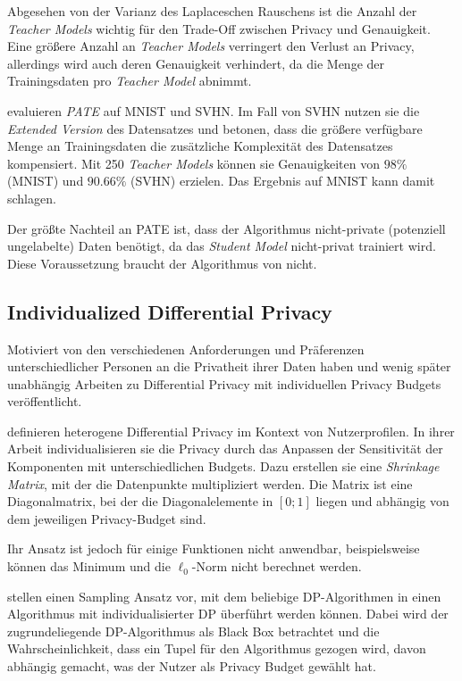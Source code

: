 Abgesehen von der Varianz des Laplaceschen Rauschens ist die Anzahl der \textit{Teacher Models} wichtig für den Trade-Off zwischen Privacy und Genauigkeit. Eine größere Anzahl an \textit{Teacher Models} verringert den Verlust an Privacy, allerdings wird auch deren Genauigkeit verhindert, da die Menge der Trainingsdaten pro \textit{Teacher Model} abnimmt.

\textcite{papernot:2017} evaluieren \textit{PATE} auf MNIST und SVHN. Im Fall von SVHN nutzen sie die \textit{Extended Version} des Datensatzes und betonen, dass die größere verfügbare Menge an Trainingsdaten die zusätzliche Komplexität des Datensatzes kompensiert. Mit 250 \textit{Teacher Models} können sie Genauigkeiten von $98\%$ (MNIST) und $90.66\%$ (SVHN) erzielen. Das Ergebnis auf MNIST kann damit \textcite{abadi:2016} schlagen.

Der größte Nachteil an PATE ist, dass der Algorithmus nicht-private (potenziell ungelabelte) Daten benötigt, da das \textit{Student Model} nicht-privat trainiert wird. Diese Voraussetzung braucht der Algorithmus von \textcite{abadi:2016} nicht.

\subsection{Individualized Differential Privacy}\label{fund-idp}

Motiviert von den verschiedenen Anforderungen und Präferenzen unterschiedlicher Personen an die Privatheit ihrer Daten haben \textcite{alaggan:2016} und wenig später unabhängig \textcite{jorgensen:2015} Arbeiten zu Differential Privacy mit individuellen Privacy Budgets veröffentlicht.

\textcite{alaggan:2016} definieren heterogene Differential Privacy im Kontext von Nutzerprofilen. In ihrer Arbeit individualisieren sie die Privacy durch das Anpassen der Sensitivität der Komponenten mit unterschiedlichen Budgets. Dazu erstellen sie eine \textit{Shrinkage Matrix}, mit der die Datenpunkte multipliziert werden. Die Matrix ist eine Diagonalmatrix, bei der die Diagonalelemente in $[0;1]$ liegen und abhängig von dem jeweiligen Privacy-Budget sind.

Ihr Ansatz ist jedoch für einige Funktionen nicht anwendbar, beispielsweise können das Minimum und die $\ell_0$-Norm nicht berechnet werden.

\textcite{jorgensen:2015} stellen einen Sampling Ansatz vor, mit dem beliebige DP-Algorithmen in einen Algorithmus mit individualisierter DP überführt werden können. Dabei wird der zugrundeliegende DP-Algorithmus als Black Box betrachtet und die Wahrscheinlichkeit, dass ein Tupel für den Algorithmus gezogen wird, davon abhängig gemacht, was der Nutzer als Privacy Budget gewählt hat.

